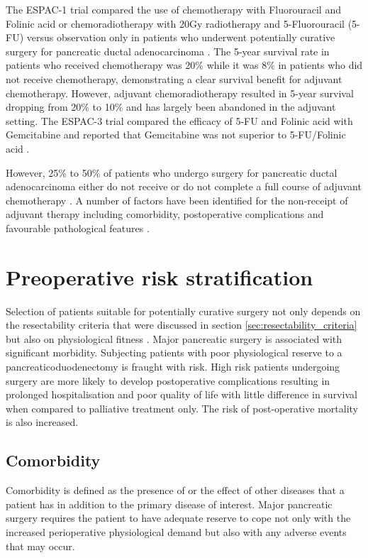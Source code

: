 The ESPAC-1 trial compared the use of chemotherapy with Fluorouracil and Folinic acid or chemoradiotherapy with 20Gy radiotherapy and 5-Fluorouracil (5-FU) versus observation only in patients who underwent potentially curative surgery for pancreatic ductal adenocarcinoma \parencite{neoptolemos_randomized_2004}. 
The 5-year survival rate in patients who received chemotherapy was 20\% while it was 8\% in patients who did not receive chemotherapy, demonstrating a clear survival benefit for adjuvant chemotherapy. 
However, adjuvant chemoradiotherapy resulted in 5-year survival dropping from 20\% to 10\% and has largely been abandoned in the adjuvant setting. 
The ESPAC-3 trial compared the efficacy of 5-FU and Folinic acid with Gemcitabine and reported that Gemcitabine was not superior to 5-FU/Folinic acid \parencite{neoptolemos_adjuvant_2010}.

However, 25\% to 50\% of patients who undergo surgery for pancreatic ductal adenocarcinoma either do not receive or do not complete a full course of adjuvant chemotherapy \parencite{sohn_resected_2000, neoptolemos_randomized_2004, oettle_adjuvant_2007}. 
A number of factors have been identified for the non-receipt of adjuvant therapy including comorbidity, postoperative complications and favourable pathological features \parencite{spitz_preoperative_1997, aloia_delayed_2007, oettle_adjuvant_2007, merchant_adjuvant_2009, russ_impact_2009}. 

\section{Preoperative risk stratification}
\label{sec:comorbidity_risk_stratification}

Selection of patients suitable for potentially curative surgery not only depends on the resectability criteria that were discussed in section \ref{sec:resectability_criteria} but also on physiological fitness \parencite{bilimoria_national_2007, sandroussi_sociodemographics_2010}. 
Major pancreatic surgery is associated with significant morbidity. 
Subjecting patients with poor physiological reserve to a pancreaticoduodenectomy is fraught with risk. 
High risk patients undergoing surgery are more likely to develop postoperative complications resulting in prolonged hospitalisation and poor quality of life with little difference in survival when compared to palliative treatment only.
The risk of post-operative mortality is also increased.

\subsection{Comorbidity}
Comorbidity is defined as the presence of or the effect of other diseases that a patient has in addition to the primary disease of interest. 
Major pancreatic surgery requires the patient to have adequate reserve to cope not only with the increased perioperative physiological demand but also with any adverse events that may occur.

